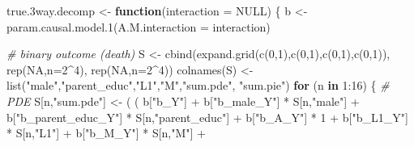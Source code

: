 \documentclass[
]{book}
\newenvironment{Shaded}{\begin{snugshade}}{\end{snugshade}}
\newcommand{\AttributeTok}[1]{\textcolor[rgb]{0.77,0.63,0.00}{#1}}
\newcommand{\CommentTok}[1]{\textcolor[rgb]{0.56,0.35,0.01}{\textit{#1}}}
\newcommand{\ConstantTok}[1]{\textcolor[rgb]{0.00,0.00,0.00}{#1}}
\newcommand{\ControlFlowTok}[1]{\textcolor[rgb]{0.13,0.29,0.53}{\textbf{#1}}}
\newcommand{\DecValTok}[1]{\textcolor[rgb]{0.00,0.00,0.81}{#1}}
\newcommand{\FloatTok}[1]{\textcolor[rgb]{0.00,0.00,0.81}{#1}}
\newcommand{\FunctionTok}[1]{\textcolor[rgb]{0.00,0.00,0.00}{#1}}
\newcommand{\NormalTok}[1]{#1}
\newcommand{\OtherTok}[1]{\textcolor[rgb]{0.56,0.35,0.01}{#1}}
\newcommand{\SpecialCharTok}[1]{\textcolor[rgb]{0.00,0.00,0.00}{#1}}
\newcommand{\StringTok}[1]{\textcolor[rgb]{0.31,0.60,0.02}{#1}}
\begin{document}
\begin{Shaded}
\begin{Highlighting}[]
\NormalTok{true}\FloatTok{.3}\NormalTok{way.decomp }\OtherTok{\textless{}{-}} \ControlFlowTok{function}\NormalTok{(}\AttributeTok{interaction =} \ConstantTok{NULL}\NormalTok{) \{}
\NormalTok{  b }\OtherTok{\textless{}{-}} \FunctionTok{param.causal.model.1}\NormalTok{(}\AttributeTok{A.M.interaction =}\NormalTok{ interaction)}
  
  \CommentTok{\# binary outcome (death)}
\NormalTok{  S }\OtherTok{\textless{}{-}} \FunctionTok{cbind}\NormalTok{(}\FunctionTok{expand.grid}\NormalTok{(}\FunctionTok{c}\NormalTok{(}\DecValTok{0}\NormalTok{,}\DecValTok{1}\NormalTok{),}\FunctionTok{c}\NormalTok{(}\DecValTok{0}\NormalTok{,}\DecValTok{1}\NormalTok{),}\FunctionTok{c}\NormalTok{(}\DecValTok{0}\NormalTok{,}\DecValTok{1}\NormalTok{),}\FunctionTok{c}\NormalTok{(}\DecValTok{0}\NormalTok{,}\DecValTok{1}\NormalTok{)), }\FunctionTok{rep}\NormalTok{(}\ConstantTok{NA}\NormalTok{,}\AttributeTok{n=}\DecValTok{2}\SpecialCharTok{\^{}}\DecValTok{4}\NormalTok{), }\FunctionTok{rep}\NormalTok{(}\ConstantTok{NA}\NormalTok{,}\AttributeTok{n=}\DecValTok{2}\SpecialCharTok{\^{}}\DecValTok{4}\NormalTok{))}
  \FunctionTok{colnames}\NormalTok{(S) }\OtherTok{\textless{}{-}} \FunctionTok{list}\NormalTok{(}\StringTok{"male"}\NormalTok{,}\StringTok{"parent\_educ"}\NormalTok{,}\StringTok{"L1"}\NormalTok{,}\StringTok{"M"}\NormalTok{,}\StringTok{"sum.pde"}\NormalTok{, }\StringTok{"sum.pie"}\NormalTok{)}
  \ControlFlowTok{for}\NormalTok{ (n }\ControlFlowTok{in} \DecValTok{1}\SpecialCharTok{:}\DecValTok{16}\NormalTok{) \{}
    \CommentTok{\# PDE }
\NormalTok{    S[n,}\StringTok{"sum.pde"}\NormalTok{] }\OtherTok{\textless{}{-}}\NormalTok{ ( ( b[}\StringTok{"b\_Y"}\NormalTok{] }\SpecialCharTok{+} 
\NormalTok{                            b[}\StringTok{"b\_male\_Y"}\NormalTok{] }\SpecialCharTok{*}\NormalTok{ S[n,}\StringTok{"male"}\NormalTok{] }\SpecialCharTok{+} 
\NormalTok{                            b[}\StringTok{"b\_parent\_educ\_Y"}\NormalTok{] }\SpecialCharTok{*}\NormalTok{ S[n,}\StringTok{"parent\_educ"}\NormalTok{] }\SpecialCharTok{+} 
\NormalTok{                            b[}\StringTok{"b\_A\_Y"}\NormalTok{] }\SpecialCharTok{*} \DecValTok{1} \SpecialCharTok{+} 
\NormalTok{                            b[}\StringTok{"b\_L1\_Y"}\NormalTok{] }\SpecialCharTok{*}\NormalTok{ S[n,}\StringTok{"L1"}\NormalTok{] }\SpecialCharTok{+}
\NormalTok{                            b[}\StringTok{"b\_M\_Y"}\NormalTok{] }\SpecialCharTok{*}\NormalTok{ S[n,}\StringTok{"M"}\NormalTok{] }\SpecialCharTok{+}

\end{Highlighting}
\end{Shaded}
\end{document}
